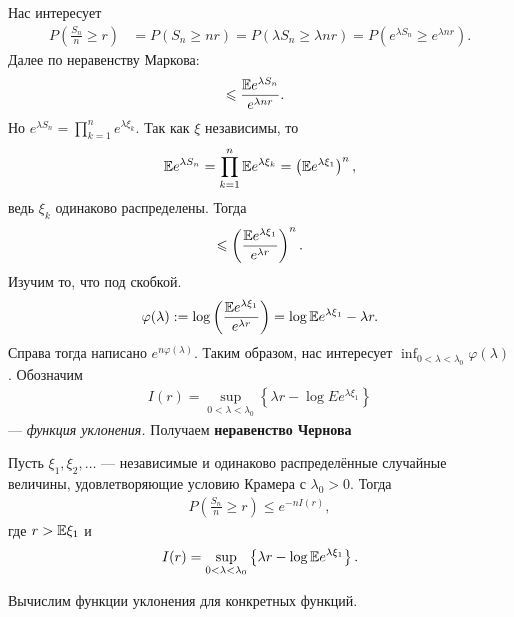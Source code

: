 \documentclass[../main.tex]{subfiles}
\begin{document}
Нас интересует
\begin{align*}
 P \left( \frac{S_n}{n} \geqslant r \right) &= P ( S_n \geqslant nr) = P (\lambda S_n \geqslant \lambda n r) = P(e^{\lambda S_n} \geqslant e^{\lambda n r}).
\end{align*} Далее по неравенству Маркова:
\begin{align*}
 &\leqslant \frac{\mathbb E e^{\lambda S_n}}{e^{\lambda n r}}.
\end{align*} Но $ e^{\lambda S_n} = \prod_{k=1}^{n}e^{\lambda \xi_k}  $. Так как $ \xi $ независимы, то
\begin{align*}
 \mathbb E e^{\lambda S_n} = \prod_{k=1}^{n} \mathbb E e^{\lambda \xi_k} = \left( \mathbb E e^{\lambda \xi_1} \right)^{n},
\end{align*} ведь $ \xi_k $ одинаково распределены. Тогда
\begin{align*}
 \leqslant \left( \frac{\mathbb E e ^{\lambda \xi_1}}{e^{\lambda r}} \right)^{n}.
\end{align*} Изучим то, что под скобкой.
\begin{align*}
 \varphi(\lambda) := \log \left( \frac{\mathbb E e^{\lambda \xi_1}}{e^{\lambda r}} \right) = \log \mathbb E e^{\lambda \xi_1} - \lambda r.
\end{align*} Справа тогда написано $ e^{n\varphi(\lambda)} $. Таким образом, нас интересует $ \inf_{0 < \lambda < \lambda_0} \varphi(\lambda) $. Обозначим
\begin{align*}
 I(r) =  \sup_{0 < \lambda < \lambda_0} \left\{ \lambda r - \log E e^{\lambda \xi_1} \right\}
\end{align*} --- \textit{функция уклонения.} Получаем \textbf{неравенство Чернова}
\begin{prop}
 Пусть $ \xi_1, \xi_2, \ldots $ --- независимые и одинаково распределённые случайные величины, удовлетворяющие условию Крамера с $ \lambda_0 > 0 $. Тогда
 \begin{align*}
  P \left( \frac{S_n}{n} \geqslant r \right) \leqslant e^{-nI(r)},
 \end{align*} где $ r > \mathbb E \xi_1 $ и
 \begin{align*}
  I(r) = \sup_{0 < \lambda < \lambda_0} \left\{ \lambda r - \log \mathbb E e^{\lambda\xi_1}  \right\}.
 \end{align*}
\end{prop}

Вычислим функции уклонения для конкретных функций.
\end{document}

